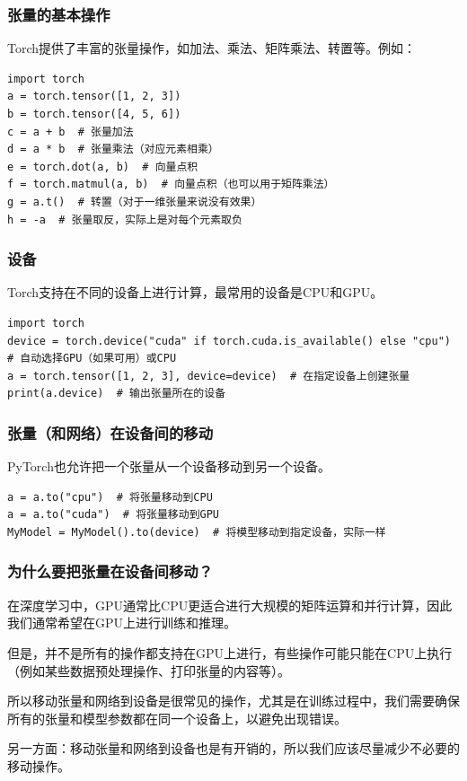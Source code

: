 \begin{frame}[fragile]
    \frametitle{张量的基本操作}

    Torch提供了丰富的张量操作，如加法、乘法、矩阵乘法、转置等。例如：
    \begin{verbatim}
import torch
a = torch.tensor([1, 2, 3])
b = torch.tensor([4, 5, 6])
c = a + b  # 张量加法
d = a * b  # 张量乘法（对应元素相乘）
e = torch.dot(a, b)  # 向量点积
f = torch.matmul(a, b)  # 向量点积（也可以用于矩阵乘法）
g = a.t()  # 转置（对于一维张量来说没有效果）
h = -a  # 张量取反，实际上是对每个元素取负
    \end{verbatim}

\end{frame}

\begin{frame}[fragile]
    \frametitle{设备}

    Torch支持在不同的设备上进行计算，最常用的设备是CPU和GPU。
    \begin{verbatim}
import torch
device = torch.device("cuda" if torch.cuda.is_available() else "cpu")  # 自动选择GPU（如果可用）或CPU
a = torch.tensor([1, 2, 3], device=device)  # 在指定设备上创建张量
print(a.device)  # 输出张量所在的设备
    \end{verbatim}

\end{frame}

\begin{frame}[fragile]
    \frametitle{张量（和网络）在设备间的移动}

    PyTorch也允许把一个张量从一个设备移动到另一个设备。
    \begin{verbatim}
a = a.to("cpu")  # 将张量移动到CPU
a = a.to("cuda")  # 将张量移动到GPU
MyModel = MyModel().to(device)  # 将模型移动到指定设备，实际一样
    \end{verbatim}

\end{frame}

\begin{frame}[fragile]
    \frametitle{为什么要把张量在设备间移动？}

    在深度学习中，GPU通常比CPU更适合进行大规模的矩阵运算和并行计算，因此我们通常希望在GPU上进行训练和推理。

    但是，并不是所有的操作都支持在GPU上进行，有些操作可能只能在CPU上执行（例如某些数据预处理操作、打印张量的内容等）。

    所以移动张量和网络到设备是很常见的操作，尤其是在训练过程中，我们需要确保所有的张量和模型参数都在同一个设备上，以避免出现错误。

    另一方面：移动张量和网络到设备也是有开销的，所以我们应该尽量减少不必要的移动操作。

\end{frame}

